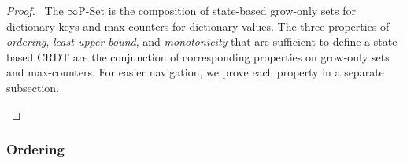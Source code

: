 \documentclass[11pt, oneside]{article}   	%
\begin{document}
\begin{proof}
	\pfsketch ~The $\infty$P-Set is the composition of state-based grow-only sets for dictionary keys and max-counters for dictionary values. The three properties of \textit{ordering}, \textit{least upper bound}, and \textit{monotonicity} that are sufficient to define a state-based CRDT are the conjunction of corresponding properties on grow-only sets and max-counters. For easier navigation, we prove each property in a separate subsection. 

	\label{proof:state-crdt}
\end{proof}

\subsubsection{Ordering}
\label{sec:longer-proofs:ordering}
\end{document}
